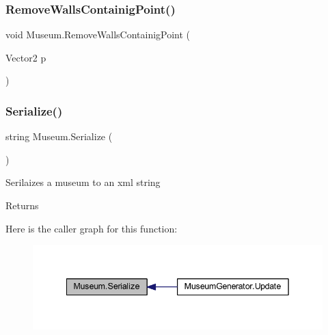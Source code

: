 \mbox{\label{class_museum_a6b395af086d9773720b1cb5536f405a8}} 
\subsubsection{\texorpdfstring{Remove\+Walls\+Containig\+Point()}{RemoveWallsContainigPoint()}}
{\footnotesize\ttfamily void Museum.\+Remove\+Walls\+Containig\+Point (\begin{DoxyParamCaption}\item[{Vector2}]{p }\end{DoxyParamCaption})\hspace{0.3cm}{\ttfamily [private]}}

\mbox{\label{class_museum_ac956bb7d7454f99944af157c79f695b8}} 
\subsubsection{\texorpdfstring{Serialize()}{Serialize()}}
{\footnotesize\ttfamily string Museum.\+Serialize (\begin{DoxyParamCaption}{ }\end{DoxyParamCaption})}



Serilaizes a museum to an xml string 

\begin{DoxyReturn}{Returns}

\end{DoxyReturn}
Here is the caller graph for this function\+:
\nopagebreak
\begin{figure}[H]
\begin{center}
\leavevmode
\includegraphics[width=342pt]{class_museum_ac956bb7d7454f99944af157c79f695b8_icgraph}
\end{center}
\end{figure}
\mbox{\label{class_museum_a72e9020ee5d8406df0fc41fc4295727f}} 
